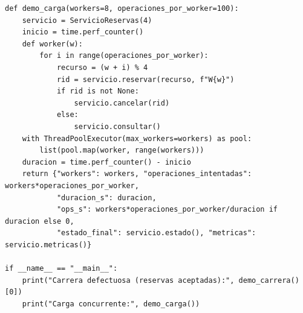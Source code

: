 \documentclass[12pt,a4paper]{article}
\begin{document}
\begin{lstlisting}[style=pycode]
def demo_carga(workers=8, operaciones_por_worker=100):
    servicio = ServicioReservas(4)
    inicio = time.perf_counter()
    def worker(w):
        for i in range(operaciones_por_worker):
            recurso = (w + i) % 4
            rid = servicio.reservar(recurso, f"W{w}")
            if rid is not None:
                servicio.cancelar(rid)
            else:
                servicio.consultar()
    with ThreadPoolExecutor(max_workers=workers) as pool:
        list(pool.map(worker, range(workers)))
    duracion = time.perf_counter() - inicio
    return {"workers": workers, "operaciones_intentadas": workers*operaciones_por_worker,
            "duracion_s": duracion,
            "ops_s": workers*operaciones_por_worker/duracion if duracion else 0,
            "estado_final": servicio.estado(), "metricas": servicio.metricas()}

if __name__ == "__main__":
    print("Carrera defectuosa (reservas aceptadas):", demo_carrera()[0])
    print("Carga concurrente:", demo_carga())

\end{lstlisting}
\end{document}
